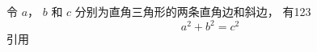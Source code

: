 
令 $a$， $b$ 和 $c$ 分别为直角三角形的两条直角边和斜边， 有123
\begin{equation}\label{test_eq1}
a^2 + b^2 = c^2
\end{equation}
引用
